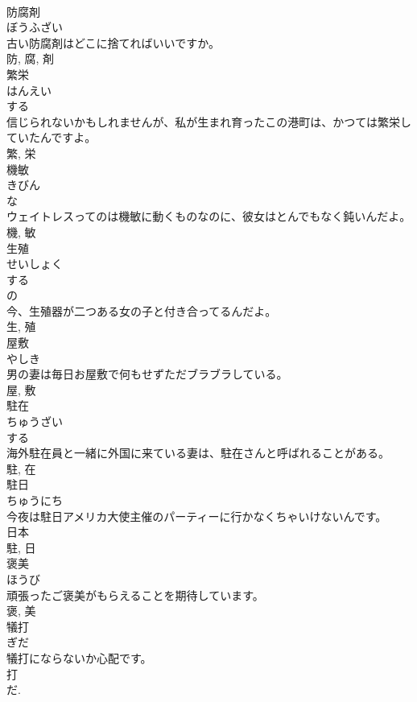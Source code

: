 \documentclass[8pt]{extreport}
\begin{document}
\begin{CJK}{UTF8}{min}
\\	防腐剤	
\\	ぼうふざい	
\\	古い防腐剤はどこに捨てればいいですか。	
\\	防, 腐, 剤	
\\	繁栄	
\\	はんえい	
\\	する 
\\	信じられないかもしれませんが、私が生まれ育ったこの港町は、かつては繁栄していたんですよ。	
\\	繁, 栄	
\\	機敏	
\\	きびん	
\\	な 
\\	ウェイトレスってのは機敏に動くものなのに、彼女はとんでもなく鈍いんだよ。	
\\	機, 敏	
\\	生殖	
\\	せいしょく	
\\	する 
\\	の 
\\	今、生殖器が二つある女の子と付き合ってるんだよ。	
\\	生, 殖	
\\	屋敷	
\\	やしき	
\\	男の妻は毎日お屋敷で何もせずただブラブラしている。	
\\	屋, 敷	
\\	駐在	
\\	ちゅうざい	
\\	する 
\\	海外駐在員と一緒に外国に来ている妻は、駐在さんと呼ばれることがある。	
\\	駐, 在	
\\	駐日	
\\	ちゅうにち	
\\	今夜は駐日アメリカ大使主催のパーティーに行かなくちゃいけないんです。	
\\	日本 
\\	駐, 日	
\\	褒美	
\\	ほうび	
\\	頑張ったご褒美がもらえることを期待しています。	
\\	褒, 美	
\\	犠打	
\\	ぎだ	
\\	犠打にならないか心配です。	
\\	打 
\\	だ. 

\end{CJK}
\end{document}
